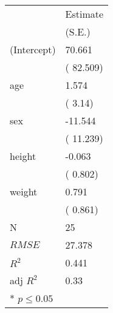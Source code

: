\begin{center}
 \begin{tabular}{*{2}{l}}
 \hline
               & Estimate  \\
              & (S.E.)  \\
\hline 
 \hline
  (Intercept)   &    70.661 \\
    &   ( 82.509) \\
  age   &    1.574 \\
    &   ( 3.14) \\
  sex   &    -11.544 \\
    &   ( 11.239) \\
  height   &    -0.063 \\
    &   ( 0.802) \\
  weight   &    0.791 \\
    &   ( 0.861) \\
 \hline 
N   &    25 \\
 $RMSE$       & 27.378  \\
 $R^2$       & 0.441  \\
 adj $R^2$       & 0.33  \\
 \hline\hline
* $p \le 0.05$\end{tabular}
\end{center}